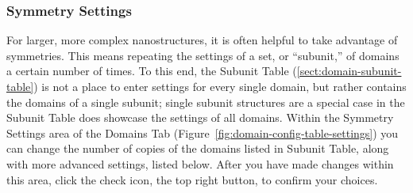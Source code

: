 \documentclass[
titlepage,
fontsize=12pt
]{article}
\begin{document}
	\subsubsection{Symmetry Settings} \label{sect:domains-symmetry-settings}
	
	For larger, more complex nanostructures, it is often helpful to take advantage of symmetries. This means repeating the settings of a set, or ``subunit,'' of domains a certain number of times. To this end, the Subunit Table (\ref{sect:domain-subunit-table}) is not a place to enter settings for every single domain, but rather contains the domains of a single subunit; single subunit structures are a special case in the Subunit Table does showcase the settings of all domains. Within the Symmetry Settings area of the Domains Tab (Figure~\ref{fig:domain-config-table-settings}) you can change the number of copies of the domains listed in Subunit Table, along with more advanced settings, listed below. After you have made changes within this area, click the check icon, the top right button, to confirm your choices. 
	
\end{document}
